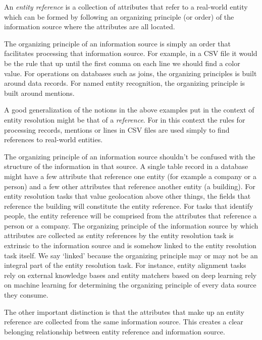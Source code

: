\documentclass[11pt]{article}
\begin{document}
    \begin{defn}
        An \textit{entity reference} is a collection of attributes that refer
        to a real-world entity which can be formed by following an organizing
        principle (or order) of the information source where the attributes are
        all located.
    \end{defn}

    The organizing principle of an information source is simply an order that
    facilitates processing that information source.
    For example, in a CSV file it would be the rule that up until the first
    comma on each line we should find a color value.
    For operations on databases such as joins, the organizing principles is
    built around data records.
    For named entity recognition, the organizing principle is built around
    mentions.

    A good generalization of the notions in the above examples put in the
    context of entity resolution might be that of a
    \textit{reference}\cite{Ben2009Swoosh}.
    For in this context the rules for processing records, mentions or lines in
    CSV files are used simply to find references to real-world entities.

    The organizing principle of an information source shouldn't be confused with
    the structure of the information in that source.
    A single table record in a database might have a few attribute that
    reference one entity (for example a company or a person) and a few other
    attributes that reference another entity (a building).
    For entity resolution tasks that value geolocation above other things, the 
    fields that reference the building will constitute the entity reference.
    For tasks that identify people, the entity reference will be comprised from
    the attributes that reference a person or a company.
    The organizing principle of the information source by which attributes are
    collected as entity references by the entity resolution task is extrinsic to
    the information source and is somehow linked to the entity resolution task
    itself.
    We say `linked' because the organizing principle may or may not be an
    integral part of the entity resolution task.
    For instance, entity alignment tasks rely on external knowledge bases and
    entity matchers based on deep learning rely on machine learning for
    determining the organizing principle of every data source they consume.

    The other important distinction is that the attributes that make up an
    entity reference are collected from the same information source.
    This creates a clear belonging relationship between entity reference and
    information source.
    
\end{document}
